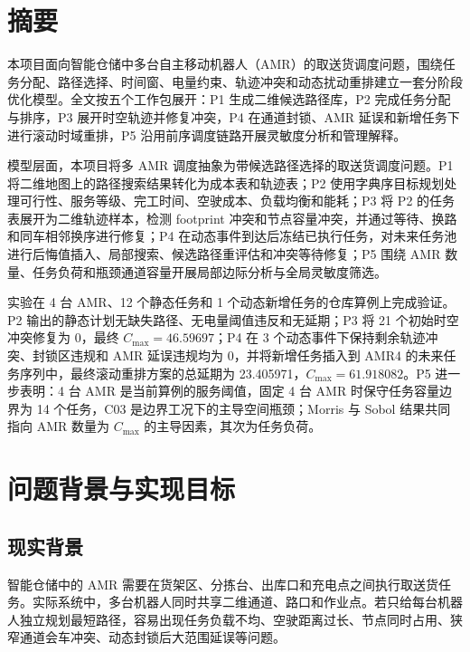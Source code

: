 \documentclass[12pt,a4paper,UTF8]{ctexart}
\begin{document}
\makeprojectcover
\setcounter{tocdepth}{2}
\tableofcontents
\newpage

\section*{摘要}

本项目面向智能仓储中多台自主移动机器人（AMR）的取送货调度问题，围绕任务分配、路径选择、时间窗、电量约束、轨迹冲突和动态扰动重排建立一套分阶段优化模型。全文按五个工作包展开：P1 生成二维候选路径库，P2 完成任务分配与排序，P3 展开时空轨迹并修复冲突，P4 在通道封锁、AMR 延误和新增任务下进行滚动时域重排，P5 沿用前序调度链路开展灵敏度分析和管理解释。

模型层面，本项目将多 AMR 调度抽象为带候选路径选择的取送货调度问题。P1 将二维地图上的路径搜索结果转化为成本表和轨迹表；P2 使用字典序目标规划处理可行性、服务等级、完工时间、空驶成本、负载均衡和能耗；P3 将 P2 的任务表展开为二维轨迹样本，检测 footprint 冲突和节点容量冲突，并通过等待、换路和同车相邻换序进行修复；P4 在动态事件到达后冻结已执行任务，对未来任务池进行后悔值插入、局部搜索、候选路径重评估和冲突等待修复；P5 围绕 AMR 数量、任务负荷和瓶颈通道容量开展局部边际分析与全局灵敏度筛选。

实验在 4 台 AMR、12 个静态任务和 1 个动态新增任务的仓库算例上完成验证。P2 输出的静态计划无缺失路径、无电量阈值违反和无延期；P3 将 21 个初始时空冲突修复为 0，最终 $C_{\max}=46.59697$；P4 在 3 个动态事件下保持剩余轨迹冲突、封锁区违规和 AMR 延误违规均为 0，并将新增任务插入到 AMR4 的未来任务序列中，最终滚动重排方案的总延期为 23.405971，$C_{\max}=61.918082$。P5 进一步表明：4 台 AMR 是当前算例的服务阈值，固定 4 台 AMR 时保守任务容量边界为 14 个任务，C03 是边界工况下的主导空间瓶颈；Morris 与 Sobol 结果共同指向 AMR 数量为 $C_{\max}$ 的主导因素，其次为任务负荷。

\section{问题背景与实现目标}

\subsection{现实背景}

智能仓储中的 AMR 需要在货架区、分拣台、出库口和充电点之间执行取送货任务。实际系统中，多台机器人同时共享二维通道、路口和作业点。若只给每台机器人独立规划最短路径，容易出现任务负载不均、空驶距离过长、节点同时占用、狭窄通道会车冲突、动态封锁后大范围延误等问题。
\end{document}
